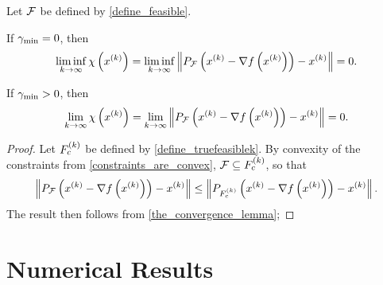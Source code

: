 \begin{theorem}
\label{the_convergence_theorem}

Let ${\mathcal F}$ be defined by \cref{define_feasible}.



If $\gamma_{\textrm{min}} = 0$, then
\begin{align*}
\liminf_{k\to\infty} \chi\left(x^{(k)}\right) = \liminf_{k\to\infty} \left\|P_{{\mathcal F}}\left(x^{(k)} - \nabla f\left(x^{(k)}\right)\right) - x^{(k)} \right\| = 0.
\end{align*}

If $\gamma_{\textrm{min}} > 0$, then
\begin{align*}
\lim_{k\to\infty} \chi\left(x^{(k)}\right) = \lim_{k\to\infty} \left\|P_{{\mathcal F}}\left(x^{(k)} - \nabla f\left(x^{(k)}\right)\right) - x^{(k)} \right\| = 0.
\end{align*}
\end{theorem}


\begin{proof}
Let ${F_c^{(k)}}$ be defined by \cref{define_truefeasiblek}.
By convexity of the constraints from \cref{constraints_are_convex}, ${\mathcal F} \subseteq {F_c^{(k)}}$, so that
\begin{align*}
\left\|P_{{\mathcal F}}\left(x^{(k)} - \nabla f\left(x^{(k)}\right)\right) - x^{(k)} \right\| 
\le \left\|P_{{F_c^{(k)}}}\left(x^{(k)} - \nabla f\left(x^{(k)}\right)\right) - x^{(k)} \right\|.
\end{align*}
The result then follows from \cref{the_convergence_lemma};

\end{proof}



% 
% 
% 

\section{Numerical Results}


